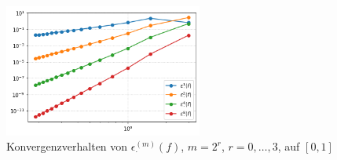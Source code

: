 \begin{figure}[H]
\centering
\includegraphics[width=65mm]{Aufgabe_2/latex_code/images/konvergenz_plot_4.png}
\caption{Konvergenzverhalten von $\epsilon_\cdot^{(m)}(f)$, $m = 2^r$, $r = 0, \ldots, 3$, auf $[0, 1]$}
\label{fig:konvergenz_plot_4}
\end{figure}